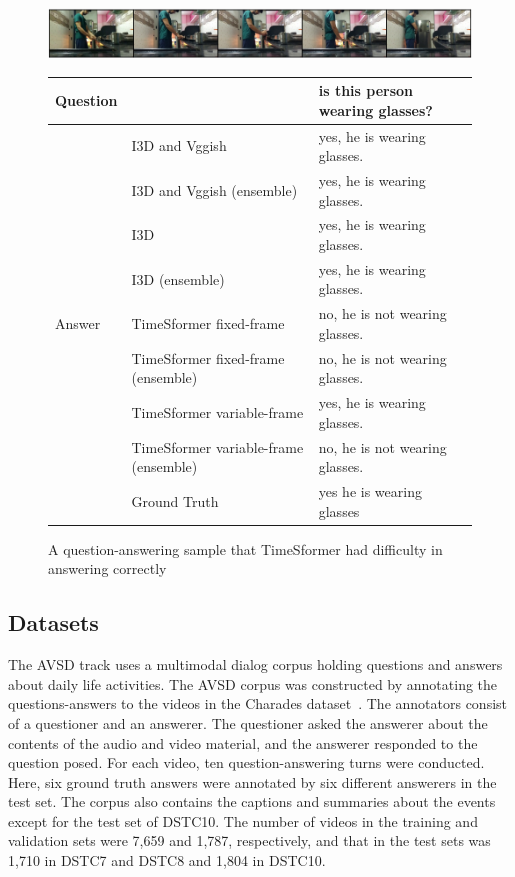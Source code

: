 \documentclass[letterpaper]{article}
\begin{document}
\begin{figure}[t]
 \centering
 \includegraphics[width=\textwidth]{./fig/3UR3Y.png}
 \begin{tabular}{lll} \hline
  Question & & is this person wearing glasses? \\ \hline
  \multirow{9}{*}{Answer} & I3D and Vggish \cite{Li2021bridging} & yes, he is wearing glasses.\\
  & I3D and Vggish (ensemble) & yes, he is wearing glasses.\\
  & I3D & yes, he is wearing glasses.\\
  & I3D (ensemble) & yes, he is wearing glasses.\\
  & TimeSformer fixed-frame & no, he is not wearing glasses.\\
  & TimeSformer fixed-frame (ensemble) & no, he is not wearing glasses.\\
  & TimeSformer variable-frame & yes, he is wearing glasses.\\
  & TimeSformer variable-frame (ensemble) & no, he is not wearing glasses.\\
  & Ground Truth & yes he is wearing glasses \\ \hline
 \end{tabular}
 \caption{A question-answering sample that TimeSformer had difficulty in answering correctly}
 \label{fig:bad_sample}
\end{figure}


\subsection{Datasets}
The AVSD track uses a multimodal dialog corpus holding questions and answers about daily life activities.
The AVSD corpus was constructed by annotating the questions-answers to the videos in the Charades dataset~\cite{Sigurdsson2016hollywood}.
The annotators consist of a questioner and an answerer.
The questioner asked the answerer about the contents of the audio and video material, and the answerer responded to the question posed.
For each video, ten question-answering turns were conducted.
Here, six ground truth answers were annotated by six different answerers in the test set.
The corpus also contains the captions and summaries about the events except for the test set of DSTC10.
The number of videos in the training and validation sets were 7,659 and 1,787, respectively, and that in the test sets was 1,710 in DSTC7 and DSTC8 and 1,804 in DSTC10.
\end{document}
